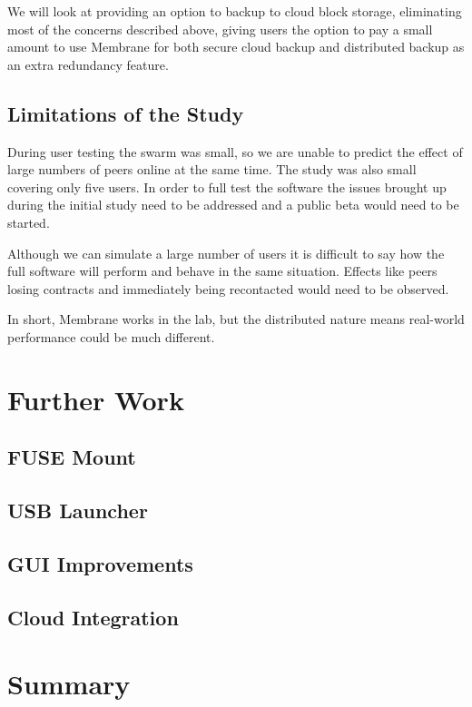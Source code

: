 \documentclass[11pt, a4paper, twocolumn, twoside]{report}
\begin{document}
We will look at providing an option to backup to cloud block storage, eliminating most of the concerns described above, giving users the option to pay a small amount to use Membrane for both secure cloud backup and distributed backup as an extra redundancy feature.

\subsection{Limitations of the Study}

During user testing the swarm was small, so we are unable to predict the effect of large numbers of peers online at the same time. The study was also small covering only five users. In order to full test the software the issues brought up during the initial study need to be addressed and a public beta would need to be started.

Although we can simulate a large number of users it is difficult to say how the full software will perform and behave in the same situation. Effects like peers losing contracts and immediately being recontacted would need to be observed.

In short, Membrane works in the lab, but the distributed nature means real-world performance could be much different.

\section{Further Work}

\subsection{FUSE Mount}

\subsection{USB Launcher}

\subsection{GUI Improvements}

\subsection{Cloud Integration}

\section{Summary}
\onecolumn
\end{document}
